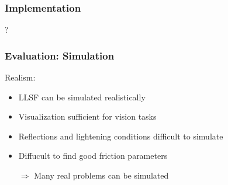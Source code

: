 \documentclass[]{beamer}
\begin{document}
\begin{frame}
  \frametitle{Implementation}
  ?
\end{frame}

\begin{frame}
  \frametitle{Evaluation: Simulation}
  Realism:\\
  \begin{itemize}
  \item LLSF can be simulated realistically
  \item Visualization sufficient for vision tasks %
  \item Reflections and lightening conditions difficult to simulate
  \item Diffucult to find good friction parameters
  \item[$\Rightarrow$] Many real problems can be simulated
  \end{itemize}
\end{frame}
\end{document}
